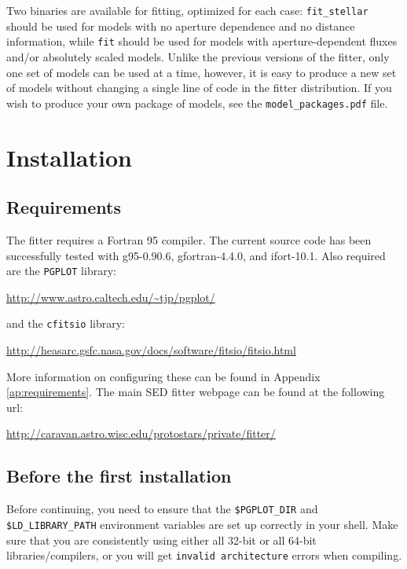 \documentclass[letterpaper,11pt]{report}
\begin{document}
Two binaries are available for fitting, optimized for each case: \texttt{fit\_stellar} should be used for models with no aperture dependence and no distance information, while \texttt{fit} should be used for models with aperture-dependent fluxes and/or absolutely scaled models. Unlike the previous versions of the fitter, only one set of models can be used at a time, however, it is easy to produce a new set of models without changing a single line of code in the fitter distribution. If you wish to produce your own package of models, see the \texttt{model\_packages.pdf} file.

\setcounter{chapter}{0}

\chapter{Installation}

\section{Requirements}

The fitter requires a Fortran 95 compiler. The current source code has been successfully tested with g95-0.90.6, gfortran-4.4.0, and ifort-10.1. Also required are the \texttt{PGPLOT} library:

\begin{center}
\url{http://www.astro.caltech.edu/~tjp/pgplot/}
\end{center}

and the \texttt{cfitsio} library:

\begin{center}
\url{http://heasarc.gsfc.nasa.gov/docs/software/fitsio/fitsio.html}
\end{center}

More information on configuring these can be found in Appendix \ref{ap:requirements}. The main SED fitter webpage can be found at the following url:

\begin{center}
\url{http://caravan.astro.wisc.edu/protostars/private/fitter/}
\end{center}

\section{Before the first installation}

Before continuing, you need to ensure that the \texttt{\$PGPLOT\_DIR} and \texttt{\$LD\_LIBRARY\_PATH} environment variables are set up correctly in your shell. Make sure that you are consistently using either all 32-bit or all 64-bit libraries/compilers, or you will get \texttt{invalid architecture} errors when compiling.\\
\end{document}
